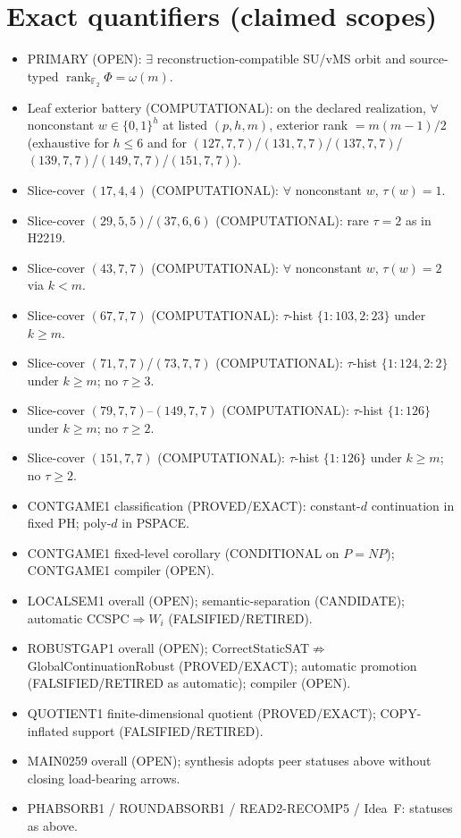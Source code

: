 \documentclass[11pt]{article}
\begin{document}
\section*{Exact quantifiers (claimed scopes)}
\begin{itemize}
\item PRIMARY (OPEN): $\exists$ reconstruction-compatible SU/vMS orbit and source-typed
  $\operatorname{rank}_{\mathbb F_2}\Phi=\omega(m)$.
\item Leaf exterior battery (COMPUTATIONAL): on the declared realization, $\forall$ nonconstant
  $w\in\{0,1\}^h$ at listed $(p,h,m)$, exterior rank $=m(m-1)/2$
  (exhaustive for $h\le6$ and for $(127,7,7)$/$(131,7,7)$/$(137,7,7)$/$(139,7,7)$/$(149,7,7)$/$(151,7,7)$).
\item Slice-cover $(17,4,4)$ (COMPUTATIONAL): $\forall$ nonconstant $w$, $\tau(w)=1$.
\item Slice-cover $(29,5,5)$/$(37,6,6)$ (COMPUTATIONAL): rare $\tau{=}2$ as in H2219.
\item Slice-cover $(43,7,7)$ (COMPUTATIONAL): $\forall$ nonconstant $w$, $\tau(w)=2$ via $k{<}m$.
\item Slice-cover $(67,7,7)$ (COMPUTATIONAL): $\tau$-hist $\{1{:}103,2{:}23\}$ under $k{\ge}m$.
\item Slice-cover $(71,7,7)$/$(73,7,7)$ (COMPUTATIONAL): $\tau$-hist $\{1{:}124,2{:}2\}$ under $k{\ge}m$;
  no $\tau{\ge}3$.
\item Slice-cover $(79,7,7)$--$(149,7,7)$ (COMPUTATIONAL): $\tau$-hist $\{1{:}126\}$ under $k{\ge}m$;
  no $\tau{\ge}2$.
\item Slice-cover $(151,7,7)$ (COMPUTATIONAL): $\tau$-hist $\{1{:}126\}$ under $k{\ge}m$;
  no $\tau{\ge}2$.
\item CONTGAME1 classification (PROVED/EXACT): constant-$d$ continuation in fixed PH;
  poly-$d$ in PSPACE.
\item CONTGAME1 fixed-level corollary (CONDITIONAL on $P=NP$); CONTGAME1 compiler (OPEN).
\item LOCALSEM1 overall (OPEN); semantic-separation (CANDIDATE); automatic CCSPC$\Rightarrow W_i$ (FALSIFIED/RETIRED).
\item ROBUSTGAP1 overall (OPEN); CorrectStaticSAT$\not\Rightarrow$GlobalContinuationRobust (PROVED/EXACT);
  automatic promotion (FALSIFIED/RETIRED as automatic); compiler (OPEN).
\item QUOTIENT1 finite-dimensional quotient (PROVED/EXACT); COPY-inflated support (FALSIFIED/RETIRED).
\item MAIN0259 overall (OPEN); synthesis adopts peer statuses above without closing load-bearing arrows.
\item PHABSORB1 / ROUNDABSORB1 / READ2-RECOMP5 / Idea~F: statuses as above.
\end{itemize}
\end{document}
